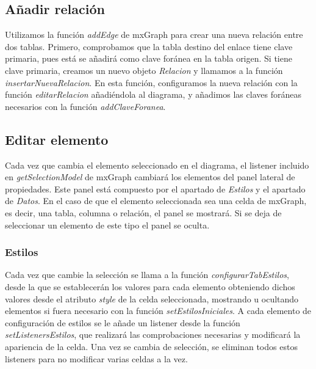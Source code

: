 
\subsection{Añadir relación}

Utilizamos la función \emph{addEdge} de mxGraph para crear una nueva relación entre dos tablas. Primero, comprobamos que la tabla destino del enlace tiene clave primaria, pues está se añadirá como clave foránea en la tabla origen. Si tiene clave primaria, creamos un nuevo objeto \textit{Relacion} y llamamos a la función \emph{insertarNuevaRelacion}. En esta función, configuramos la nueva relación con la función \emph{editarRelacion} añadiéndola al diagrama, y añadimos las claves foráneas necesarios con la función \emph{addClaveForanea}.


\subsection{Editar elemento}

Cada vez que cambia el elemento seleccionado en el diagrama, el listener incluido en \emph{getSelectionModel} de mxGraph cambiará los elementos del panel lateral de propiedades. Este panel está compuesto por el apartado de \textit{Estilos} y el apartado de \textit{Datos}. En el caso de que el elemento seleccionada sea una celda de mxGraph, es decir, una tabla, columna o relación, el panel se mostrará. Si se deja de seleccionar un elemento de este tipo el panel se oculta.

\subsubsection{Estilos}

Cada vez que cambie la selección se llama a la función \emph{configurarTabEstilos}, desde la que se establecerán los valores para cada elemento obteniendo dichos valores desde el atributo \textit{style} de la celda seleccionada, mostrando u ocultando elementos si fuera necesario con la función \emph{setEstilosIniciales}. A cada elemento de configuración de estilos se le añade un listener desde la función \emph{setListenersEstilos}, que realizará las comprobaciones necesarias y modificará la apariencia de la celda. Una vez se cambia de selección, se eliminan todos estos listeners para no modificar varias celdas a la vez.

